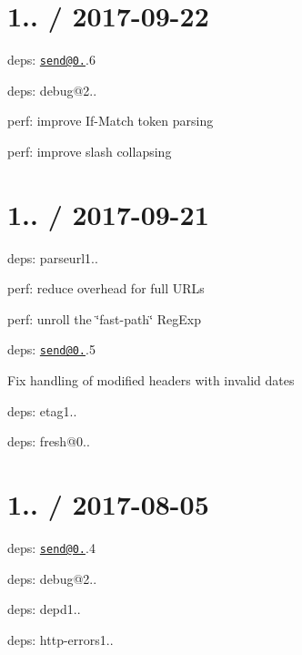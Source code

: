 \section*{1.. / 2017-\/09-\/22 }


\begin{DoxyItemize}
\item deps\+: \href{mailto:send@0.15}{\tt send@0.}.6
\begin{DoxyItemize}
\item deps\+: debug@2..
\item perf\+: improve {\ttfamily If-\/\+Match} token parsing
\end{DoxyItemize}
\item perf\+: improve slash collapsing
\end{DoxyItemize}

\section*{1.. / 2017-\/09-\/21 }


\begin{DoxyItemize}
\item deps\+: parseurl1..
\begin{DoxyItemize}
\item perf\+: reduce overhead for full U\+R\+Ls
\item perf\+: unroll the \char`\"{}fast-\/path\char`\"{} {\ttfamily Reg\+Exp}
\end{DoxyItemize}
\item deps\+: \href{mailto:send@0.15}{\tt send@0.}.5
\begin{DoxyItemize}
\item Fix handling of modified headers with invalid dates
\item deps\+: etag1..
\item deps\+: fresh@0..
\end{DoxyItemize}
\end{DoxyItemize}

\section*{1.. / 2017-\/08-\/05 }


\begin{DoxyItemize}
\item deps\+: \href{mailto:send@0.15}{\tt send@0.}.4
\begin{DoxyItemize}
\item deps\+: debug@2..
\item deps\+: depd1..
\item deps\+: http-\/errors1..
\end{DoxyItemize}
\end{DoxyItemize}

